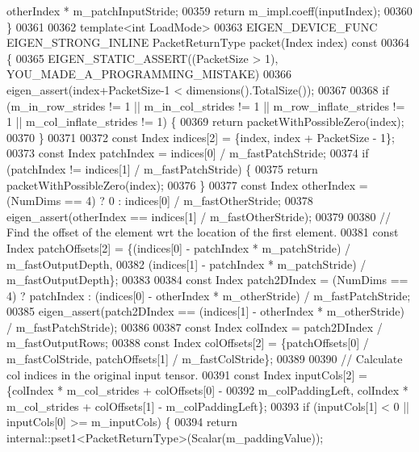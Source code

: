 \begin{DoxyCode}
      otherIndex * m\_patchInputStride;
00359     \textcolor{keywordflow}{return} m\_impl.coeff(inputIndex);
00360   \}
00361 
00362   \textcolor{keyword}{template}<\textcolor{keywordtype}{int} LoadMode>
00363   EIGEN\_DEVICE\_FUNC EIGEN\_STRONG\_INLINE PacketReturnType packet(Index index)\textcolor{keyword}{ const}
00364 \textcolor{keyword}{  }\{
00365     EIGEN\_STATIC\_ASSERT((PacketSize > 1), YOU\_MADE\_A\_PROGRAMMING\_MISTAKE)
00366     eigen\_assert(index+PacketSize-1 < dimensions().TotalSize());
00367 
00368     \textcolor{keywordflow}{if} (m\_in\_row\_strides != 1 || m\_in\_col\_strides != 1 || m\_row\_inflate\_strides != 1 || 
      m\_col\_inflate\_strides != 1) \{
00369       \textcolor{keywordflow}{return} packetWithPossibleZero(index);
00370     \}
00371 
00372     \textcolor{keyword}{const} Index indices[2] = \{index, index + PacketSize - 1\};
00373     \textcolor{keyword}{const} Index patchIndex = indices[0] / m\_fastPatchStride;
00374     \textcolor{keywordflow}{if} (patchIndex != indices[1] / m\_fastPatchStride) \{
00375       \textcolor{keywordflow}{return} packetWithPossibleZero(index);
00376     \}
00377     \textcolor{keyword}{const} Index otherIndex = (NumDims == 4) ? 0 : indices[0] / m\_fastOtherStride;
00378     eigen\_assert(otherIndex == indices[1] / m\_fastOtherStride);
00379 
00380     \textcolor{comment}{// Find the offset of the element wrt the location of the first element.}
00381     \textcolor{keyword}{const} Index patchOffsets[2] = \{(indices[0] - patchIndex * m\_patchStride) / m\_fastOutputDepth,
00382                                    (indices[1] - patchIndex * m\_patchStride) / m\_fastOutputDepth\};
00383 
00384     \textcolor{keyword}{const} Index patch2DIndex = (NumDims == 4) ? patchIndex : (indices[0] - otherIndex * m\_otherStride) / 
      m\_fastPatchStride;
00385     eigen\_assert(patch2DIndex == (indices[1] - otherIndex * m\_otherStride) / m\_fastPatchStride);
00386 
00387     \textcolor{keyword}{const} Index colIndex = patch2DIndex / m\_fastOutputRows;
00388     \textcolor{keyword}{const} Index colOffsets[2] = \{patchOffsets[0] / m\_fastColStride, patchOffsets[1] / m\_fastColStride\};
00389 
00390     \textcolor{comment}{// Calculate col indices in the original input tensor.}
00391     \textcolor{keyword}{const} Index inputCols[2] = \{colIndex * m\_col\_strides + colOffsets[0] -
00392       m\_colPaddingLeft, colIndex * m\_col\_strides + colOffsets[1] - m\_colPaddingLeft\};
00393     \textcolor{keywordflow}{if} (inputCols[1] < 0 || inputCols[0] >= m\_inputCols) \{
00394       \textcolor{keywordflow}{return} internal::pset1<PacketReturnType>(Scalar(m\_paddingValue));

\end{DoxyCode}
